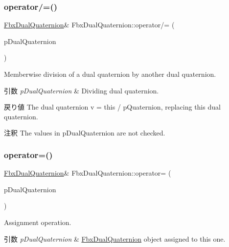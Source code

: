 \subsubsection{\texorpdfstring{operator/=()}{operator/=()}\hspace{0.1cm}{\footnotesize\ttfamily [2/2]}}
{\footnotesize\ttfamily \hyperlink{class_fbx_dual_quaternion}{Fbx\+Dual\+Quaternion}\& Fbx\+Dual\+Quaternion\+::operator/= (\begin{DoxyParamCaption}\item[{const \hyperlink{class_fbx_dual_quaternion}{Fbx\+Dual\+Quaternion} \&}]{p\+Dual\+Quaternion }\end{DoxyParamCaption})}

Memberwise division of a dual quaternion by another dual quaternion. 
\begin{DoxyParams}{引数}
{\em p\+Dual\+Quaternion} & Dividing dual quaternion. \\
\hline
\end{DoxyParams}
\begin{DoxyReturn}{戻り値}
The dual quaternion v\textquotesingle{} = this / p\+Quaternion, replacing this dual quaternion. 
\end{DoxyReturn}
\begin{DoxyRemark}{注釈}
The values in p\+Dual\+Quaternion are not checked. 
\end{DoxyRemark}
\mbox{\label{class_fbx_dual_quaternion_ad647f8f27c587a4cd254fc87c821bd49}} 
\subsubsection{\texorpdfstring{operator=()}{operator=()}}
{\footnotesize\ttfamily \hyperlink{class_fbx_dual_quaternion}{Fbx\+Dual\+Quaternion}\& Fbx\+Dual\+Quaternion\+::operator= (\begin{DoxyParamCaption}\item[{const \hyperlink{class_fbx_dual_quaternion}{Fbx\+Dual\+Quaternion} \&}]{p\+Dual\+Quaternion }\end{DoxyParamCaption})}

Assignment operation. 
\begin{DoxyParams}{引数}
{\em p\+Dual\+Quaternion} & \hyperlink{class_fbx_dual_quaternion}{Fbx\+Dual\+Quaternion} object assigned to this one. \\
\hline
\end{DoxyParams}
\mbox{\label{class_fbx_dual_quaternion_aeaf9715f0816c453828ebef237318151}} 
